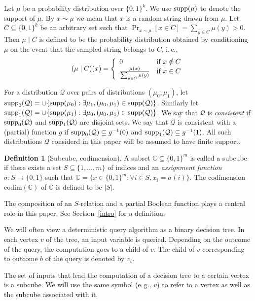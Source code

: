 \documentclass[11pt]{article}
\numberwithin{equation}{section}
\theoremstyle{definition}
\newtheorem{definition}[theorem]{Definition}
\theoremstyle{plain}
\newcommand{\C}{\mathbb C}
\newcommand{\ie}{i.\,e.}
\newcommand{\eg}{e.\,g.}
\newcommand{\arelation}{an $S$-relation\xspace} %
\newcommand{\codim}{\mathrm{codim}}
\newcommand\supp{\mathop{\rm supp}}
\newcommand{\clQ}{\mathcal{Q}}
\begin{document}
Let $\mu$ be a probability distribution over $\{0,1\}^k$. We use $\supp(\mu)$ to denote the support of $\mu$.  By $x \sim \mu$ we mean that $x$ is a random string drawn from $\mu$. Let $C \subseteq \{0,1\}^k$ be an arbitrary set 
such that $\Pr_{x \sim \mu}[x \in C]= \sum_{y \in C} \mu(y) > 0$. Then $\mu \mid C$ is defined to be the probability distribution obtained by conditioning $\mu$ on the event that the sampled string belongs to $C$, \ie,
\[
(\mu \mid C)(x)=\left\{  \begin{array}{ll} $0$ & \mbox{if $x \notin C$} \\
\frac{\mu(x)}{\sum_{y \in C} \mu(y)} & \mbox{if $x \in C$}\end{array}   \right.
\]

For a distribution $\clQ$ over pairs of distributions $(\mu_0, \mu_1)$, let $\supp_0(\clQ) = \cup \{ \supp(\mu_0) : \exists \mu_1, (\mu_0, \mu_1) \in \supp(\clQ)\}$.  Similarly let 
$\supp_1(\clQ) = \cup \{ \supp(\mu_1) : \exists \mu_0, (\mu_0, \mu_1) \in \supp(\clQ)\}$.  We say that $\clQ$ is \emph{consistent} if $\supp_0(\clQ)$ and $\supp_1(\clQ)$ are disjoint 
sets.  We say that $\clQ$ is consistent with a (partial) function $g$ if $\supp_0(\clQ) \subseteq g^{-1}(0)$ and $\supp_1(\clQ) \subseteq g^{-1}(1)$. All such distributions $\clQ$ considerd in this paper will be assumed to have finite support. 

%
\begin{definition}[Subcube, codimension]
A subset $\C \subseteq \{0,1\}^m$ is called a
subcube if there exists a set $S \subseteq \{1, \ldots, m\}$ of indices and an \emph{assignment function} $\sigma:S \rightarrow \{0,1\}$ such that $\C=\{x \in \{0,1\}^m:\forall i \in S, x_i=\sigma(i)\}$. The 
codimension $\codim(\C)$ of $\C$ is defined to be $|S|$. 
\end{definition}
%
%
The composition of \arelation and a partial Boolean function plays a central role in this paper. See Section~\ref{intro} for a definition.

We will often view a deterministic query algorithm as a binary decision tree. In each vertex $v$ of the tree, an input variable is queried. Depending on the outcome of the query, the computation goes to a child of $v$. The child of $v$ corresponding to outcome $b$ of the query is denoted by $v_b$.

The set of inputs that lead the computation of a decision tree to a certain vertex is a subcube. We will use the same symbol (\eg, $v$) to refer to a vertex as well as the subcube associated with it.
\end{document}
